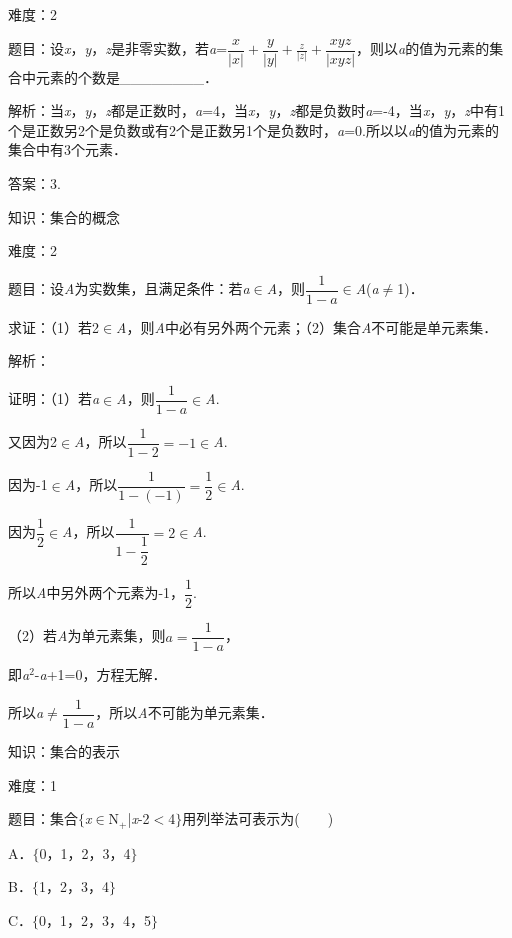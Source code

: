 \documentclass{article} %
\begin{document}
难度：2

题目：设\textit{x}，\textit{y}，\textit{z}是非零实数，若\textit{a}=$\dfrac{x}{|\textit{x}|}+\dfrac{y}{|\textit{y}|}+\frac{z}{|\textit{z}|}+\dfrac{xyz}{|\textit{xyz}|}$，则以\textit{a}的值为元素的集合中元素的个数是\_\_\_\_\_\_\_\_．

解析：当\textit{x}，\textit{y}，\textit{z}都是正数时，\textit{a}=4，当\textit{x}，\textit{y}，\textit{z}都是负数时\textit{a}=-4，当\textit{x}，\textit{y}，\textit{z}中有1个是正数另2个是负数或有2个是正数另1个是负数时，\textit{a}=0.所以以\textit{a}的值为元素的集合中有3个元素．

答案：3.

知识：集合的概念

难度：2

题目：设\textit{A}为实数集，且满足条件：若\textit{a}$\mathrm{\in}$\textit{A}，则$\dfrac{1}{1-a}\mathrm{\in}$\textit{A}(\textit{a}$\mathrm{\neq}$1)．

求证：（1）若2$\mathrm{\in}$\textit{A}，则\textit{A}中必有另外两个元素；（2）集合\textit{A}不可能是单元素集．

解析：

证明：（1）若\textit{a}$\mathrm{\in}$\textit{A}，则$\dfrac{1}{1-a}\mathrm{\in}$\textit{A}.

又因为2$\mathrm{\in}$\textit{A}，所以$\dfrac{1}{1-2}=-1\mathrm{\in}$\textit{A}.

因为-1$\mathrm{\in}$\textit{A}，所以$\dfrac{1}{1-(-1)}=\dfrac{1}{2}\mathrm{\in}$\textit{A}.

因为$\dfrac{1}{2}\mathrm{\in}$\textit{A}，所以$\dfrac{1}{1-\dfrac{1}{2}}=2\mathrm{\in}$\textit{A}.

所以\textit{A}中另外两个元素为-1，$\dfrac{1}{2}$.

（2）若\textit{A}为单元素集，则$a=\dfrac{1}{1-a}$，

即\textit{a}${}^{2}$-\textit{a}+1=0，方程无解．

所以\textit{a}$\mathrm{\neq}\dfrac{1}{1-a}$，所以\textit{A}不可能为单元素集．



知识：集合的表示

难度：1

题目：集合$\mathrm{\{}$\textit{x}$\mathrm{\in}$N${}_{\textrm{+}}$|\textit{x}-2$\mathrm{<}$4$\mathrm{\}}$用列举法可表示为(　　)

A．$\mathrm{\{}$0，1，2，3，4$\mathrm{\}}$　

B．$\mathrm{\{}$1，2，3，4$\mathrm{\}}$

C．$\mathrm{\{}$0，1，2，3，4，5$\mathrm{\}}$
\end{document}
